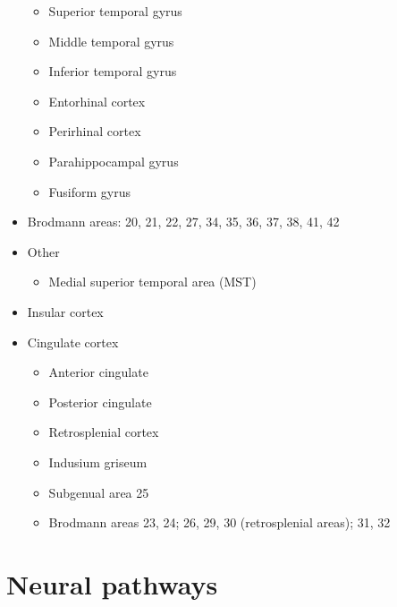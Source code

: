 \begin{itemize}
  \begin{itemize}
  \tightlist
  \item
    Superior temporal gyrus
  \item
    Middle temporal gyrus
  \item
    Inferior temporal gyrus
  \item
    Entorhinal cortex
  \item
    Perirhinal cortex
  \item
    Parahippocampal gyrus
  \item
    Fusiform gyrus
  \end{itemize}
\item
  Brodmann areas: 20, 21, 22, 27, 34, 35, 36, 37, 38, 41, 42
\item
  Other

  \begin{itemize}
  \tightlist
  \item
    Medial superior temporal area (MST)
  \end{itemize}
\item
  Insular cortex
\item
  Cingulate cortex

  \begin{itemize}
  \tightlist
  \item
    Anterior cingulate
  \item
    Posterior cingulate
  \item
    Retrosplenial cortex
  \item
    Indusium griseum
  \item
    Subgenual area 25
  \item
    Brodmann areas 23, 24; 26, 29, 30 (retrosplenial areas); 31, 32
  \end{itemize}
\end{itemize}

\hypertarget{neural-pathways}{%
\chapter{Neural pathways}\label{neural-pathways}}

